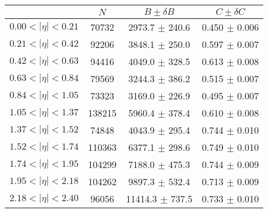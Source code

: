 \begin{tabular}{lccc}
\hline
    &   $N$   & $B \pm \delta B$  &  $C \pm \delta C$ \\
\hline
$0.00 < |\eta| <0.21$          & 70732      & 2973.7     $\pm$ 240.6 & 0.450      $\pm$ 0.006 \\
$0.21 < |\eta| <0.42$          & 92206      & 3848.1     $\pm$ 250.0 & 0.597      $\pm$ 0.007 \\
$0.42 < |\eta| <0.63$          & 94416      & 4049.0     $\pm$ 328.5 & 0.613      $\pm$ 0.008 \\
$0.63 < |\eta| <0.84$          & 79569      & 3244.3     $\pm$ 386.2 & 0.515      $\pm$ 0.007 \\
$0.84 < |\eta| <1.05$          & 73323      & 3169.0     $\pm$ 226.9 & 0.495      $\pm$ 0.007 \\
$1.05 < |\eta| <1.37$          & 138215     & 5960.4     $\pm$ 378.4 & 0.610      $\pm$ 0.008 \\
$1.37 < |\eta| <1.52$          & 74848      & 4043.9     $\pm$ 295.4 & 0.744      $\pm$ 0.010 \\
$1.52 < |\eta| <1.74$          & 110363     & 6377.1     $\pm$ 298.6 & 0.749      $\pm$ 0.010 \\
$1.74 < |\eta| <1.95$          & 104299     & 7188.0     $\pm$ 475.3 & 0.744      $\pm$ 0.009 \\
$1.95 < |\eta| <2.18$          & 104262     & 9897.3     $\pm$ 532.4 & 0.713      $\pm$ 0.009 \\
$2.18 < |\eta| <2.40$          & 96056      & 11414.3    $\pm$ 737.5 & 0.733      $\pm$ 0.010 \\
\hline
\end{tabular}
